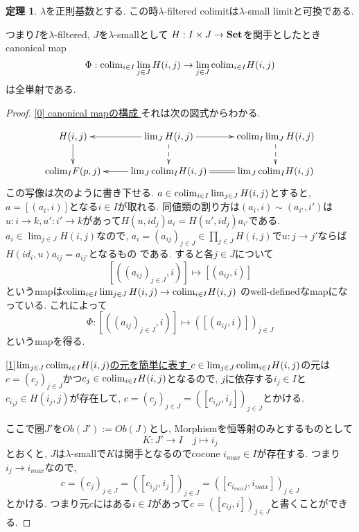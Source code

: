 \documentclass[dvipdfmx,a4paper,11pt]{article}
\newcommand{\colim}{{\rm colim}}
\theoremstyle{definition}
\newtheorem{thm}{定理}
\begin{document}
 \begin{tcolorbox}
 [colback = white, colframe = green!35!black, fonttitle = \bfseries,breakable = true]
\begin{thm}
\label{thm-regular-commute}
$\lambda$を正則基数とする. 
この時$\lambda$-filtered colimitは$\lambda$-small limitと可換である.

つまり$I$を$\lambda$-filtered, $J$を$\lambda$-smallとして
$H : I \times J \to {\bf Set}$を関手としたとき
canonical map
$$
\Phi: \colim_{i \in I} \lim_{j \in J}H(i,j)
\to
\lim_{j \in J}
\colim_{i \in I} H(i,j)
$$
は全単射である. 
\end{thm}
 \end{tcolorbox}

\begin{proof}

\underline{[0] canonical mapの構成 }
それは次の図式からわかる. 

\begin{equation*}
\xymatrix@C=25pt@R=20pt{
H(i,j)\ar@{->}[d]
& \lim_{J} H(i,j)\ar@{-->}[d]\ar@{->}[l]\ar@{->}[r]
&\colim_{I}\lim_{J} H(i,j)\ar@{-->}[d]
\\
\colim_{I}F(p,j)
&\lim_{J}\colim_{I}H(i,j)\ar@{->}[l]
&\lim_{J}\colim_{I}H(i,j)\ar@{=}[l] \\   
}
\end{equation*}
この写像は次のように書き下せる.
$a \in \colim_{i \in I} \lim_{j \in J}H(i,j)$とすると, $a = [(a_i, i)]$となる$i \in I$が取れる.
同値類の割り方は$(a_i, i) \sim (a_{i'}, i')$は$u : i \to k, u' : i' \to k$があって$H(u, id_{j})a_i = H(u', id_{j})a_{i'}$である.
$a_i \in \lim_{j \in J}H(i,j)$なので, 
$a_i =(a_{ij})_{j \in J} \in \prod_{j \in J}H(i,j)$で$u : j \to j'$ならば$H(id_{i}, u)a_{ij} = a_{ij'}$となるもの
である.
すると各$j \in J$について
$$
[((a_{ij})_{j \in J} , i)] \mapsto [(a_{ij}, i)]
$$
というmapは$\colim_{i \in I} \lim_{j \in J}H(i,j) \to \colim_{i \in I} H(i,j)$
のwell-definedなmapになっている. これによって
$$
\Phi : [((a_{ij})_{j \in J} , i)] \mapsto ([(a_{ij}, i)])_{j \in J}
$$
というmapを得る. 

\underline{[1]$\lim_{j \in J}\colim_{i \in I} H(i,j)$の元を簡単に表す } 
$c \in \lim_{j \in J}\colim_{i \in I} H(i,j)$の元は
$c = (c_j)_{j \in J}$かつ$c_j \in \colim_{i \in I} H(i,j)$となるので, 
$j$に依存する$i_{j} \in I$と$c_{i_{j}j} \in H(i_{j},j)$が存在して, 
$c = (c_j)_{j \in J}=([c_{i_{j}j}, i_{j}])_{j \in J}$とかける. 

ここで圏$J'$を$Ob(J'):=Ob(J)$とし, Morphismを恒等射のみとするものとして
$$
K : J' \to I \quad j \mapsto i_{j}
$$
とおくと, $J$は$\lambda$-smallで$K$は関手となるのでcocone $i_{max} \in I$が存在する.
つまり$i_j \to i_{max}$なので,
 $$
 c = (c_j)_{j \in J}=([c_{i_{j}j}, i_{j}])_{j \in J}
 =([c_{i_{max}j}, i_{max}])_{j \in J}
 $$
 とかける. 
 つまり元$c$にはある$i \in I$があって$c= ([c_{ij}, i])_{j \in J}$と書くことができる. 
 


\end{proof}
\end{document}
